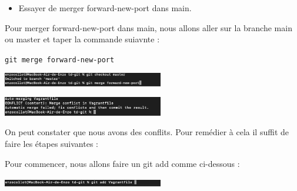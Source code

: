 \documentclass[12pt]{article}
\begin{document}
\vspace{0.3cm}

\newpage

\vspace{0.3cm}

\begin{itemize}
  \item Essayer de merger forward-new-port dans main.
\end{itemize}

\vspace{0.3cm}

Pour merger forward-new-port dans main, nous allons aller sur la branche main ou master et taper la commande suiavnte : 

\texttt{git merge forward-new-port}

\vspace{0.3cm}

\begin{center}
  \includegraphics[width=7cm]{Image-TD-Git-4/git-merge.png}
\end{center}

\vspace{0.3cm}

\begin{center}
  \includegraphics[width=7cm]{Image-TD-Git-4/Conflits.png}
\end{center}

\vspace{0.3cm}

On peut constater que nous avons des conflits. Pour remédier à cela il suffit de faire les étapes suivantes : 

\vspace{0.3cm}

Pour commencer, nous allons faire un git add comme ci-dessous : 

\vspace{0.3cm}

\begin{center}
  \includegraphics[width=7cm]{Image-TD-Git-4/git add.png}
\end{center}

\vspace{0.3cm}
\end{document}
